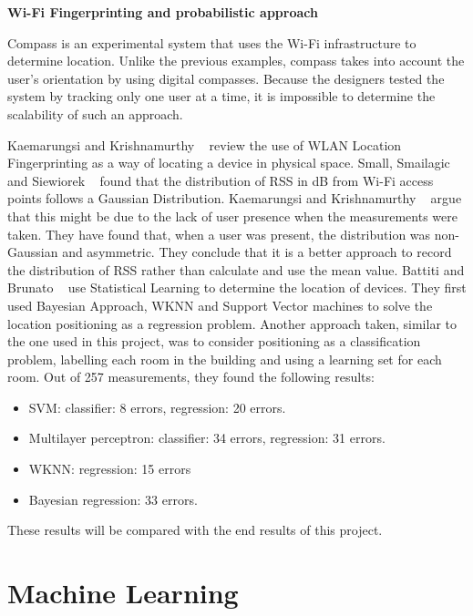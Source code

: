 \medskip
\noindent \textbf{Wi-Fi Fingerprinting and probabilistic approach}

Compass \cite{King} is an experimental system that uses the Wi-Fi infrastructure to determine location. Unlike the previous examples, compass takes into account the user’s orientation by using digital compasses. Because the designers tested the system by tracking only one user at a time, it is impossible to determine the scalability of such an approach.

Kaemarungsi and Krishnamurthy ~\cite{Kaemarungsi} review the use of WLAN Location Fingerprinting as a way of locating a device in physical space. Small, Smailagic and Siewiorek ~\cite{Small} found that the distribution of RSS in dB from Wi-Fi access points follows a Gaussian Distribution. Kaemarungsi and Krishnamurthy ~\cite{Kaemarungsi} argue that this might be due to the lack of user presence when the measurements were taken. They have found that, when a user was present, the distribution was non-Gaussian and asymmetric. They conclude that it is a better approach to record the distribution of RSS rather than calculate and use the mean value. 
Battiti and Brunato ~\cite{Battiti} use Statistical Learning to determine the location of devices. They first used Bayesian Approach, WKNN and Support Vector machines to solve the location positioning as a regression problem. Another approach taken, similar to the one used in this project, was to consider positioning as a classification problem, labelling each room in the building and using a learning set for each room. Out of 257 measurements, they found the following results:
\begin{itemize}
\item SVM: classifier: 8 errors, regression: 20 errors.
\item Multilayer perceptron: classifier: 34 errors, regression: 31 errors.
\item WKNN: regression: 15 errors
\item Bayesian regression: 33 errors.
\end{itemize}
These results will be compared with the end results of this project.

\section{Machine Learning}

